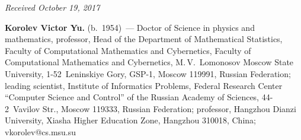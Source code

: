 \vspace*{-6pt}

\hfill{\small\textit{Received October 19, 2017}}


\Contrl

\noindent
\textbf{Korolev Victor Yu.} (b.\ 1954)~---
 Doctor of Science in physics and mathematics, professor, Head of the Department 
 of Mathematical Statistics, Faculty of Computational Mathematics and 
 Cybernetics, Faculty of Computational Mathematics and Cybernetics, M.\,V.~Lomonosov 
 Moscow State University, 1-52~Leninskiye Gory, GSP-1, Moscow 119991, 
 Russian Federation; leading scientist, Institute of Informatics Problems, 
 Federal Research Center ``Computer Science and Control'' 
 of the Russian Academy of Sciences, 44-2~Vavilov Str., Moscow 119333,  
 Russian Federation;  professor, Hangzhou Dianzi University, 
 Xiasha Higher Education Zone, Hangzhou 310018, China; \mbox{vkorolev@cs.msu.su}
\label{end\stat}


\renewcommand{\bibname}{\protect\rm Литература} 